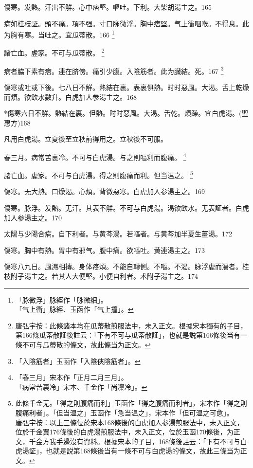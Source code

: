 \documentclass[12pt,twoside,UTF8,b5paper]{ctexbook}
\begin{document}
傷寒。发熱。汗出不觧。心中痞堅。嘔吐。下利。大柴胡湯主之。165

病如桂枝証。頭不痛。項不强。寸{口}脉微浮。胸中痞堅。气上衝咽喉。不得息。此为胸有寒。当吐之。宜瓜蒂散。166
	\footnote{「脉微浮」脉經作「脉微細」。\\「气上衝」脉經、玉函作「气上撞」。}

諸亡血。虗家。不可与瓜蒂散。
	\footnote{唐弘宇按：此條諸本均在瓜蒂散煎服法中，未入正文。根據宋本獨有的子目，第166條瓜蒂散証後註云：「下有不可与瓜蒂散証」，也就是説第166條後当有一條不可与瓜蒂散的條文，故此條当为正文。}

病者脇下素有痞。連在脐傍。痛引少腹。入陰筋者。此为臓結。死。167
	\footnote{「入陰筋者」玉函作「入陰俠陰筋者」。}

傷寒或吐或下後。七八日不觧。熱結在裏。表裏俱熱。时时惡風。大渴。舌上乾燥而煩。欲飲水數升。白虎{加人参}湯主之。168

*傷寒六日不觧。熱結在裏。但熱。时时惡風。大渴。舌乾。煩躁。宜白虎湯。(聖惠方)168

凡用白虎湯。立夏後至立秋前得用之。立秋後不可服。

春三月。病常苦裏冷。不可与白虎湯。与之則嘔利而腹痛。
	\footnote{「春三月」宋本作「正月二月三月」。\\「病常苦裏冷」宋本、千金作「尚凜冷」。}

諸亡血。虗家。不可与白虎湯。得之則腹痛而利。但当温之。
	\footnote{此條千金无。「得之則腹痛而利」玉函作「得之腹痛而利者」，宋本作「得之則腹痛利者」。「但当温之」玉函作「急当温之」，宋本作「但可温之可愈」。\\唐弘宇按：以上三條位於宋本168條後的白虎加人参湯煎服法中，未入正文，位於千金翼176條後的白虎湯煎服法中，未入正文，位於玉函170條後，为正文，千金方我手邊沒有資料。根據宋本的子目，168條後註云：「下有不可与白虎湯証」，也就是説第168條後当有一條不可与白虎湯的條文，故此三條当为正文。}

傷寒。无大熱。口燥渴。心煩。背微惡寒。白虎{加人参}湯主之。169

傷寒。脉浮。发熱。无汗。其表不觧。不可与白虎湯。渴欲飲水。无表証者。白虎{加人参}湯主之。170

太陽与少陽合病。自下利者。与黄芩湯。若嘔者。与黄芩加半夏生薑湯。172

傷寒。胸中有熱。胃中有邪气。腹中痛。欲嘔吐。黄連湯主之。173

傷寒八九日。風濕相摶。身体疼煩。不能自轉側。不嘔。不渴。脉浮虗而濇者。桂枝附子湯主之。若其人大便堅。小便自利者。术附子湯主之。174
\end{document}
